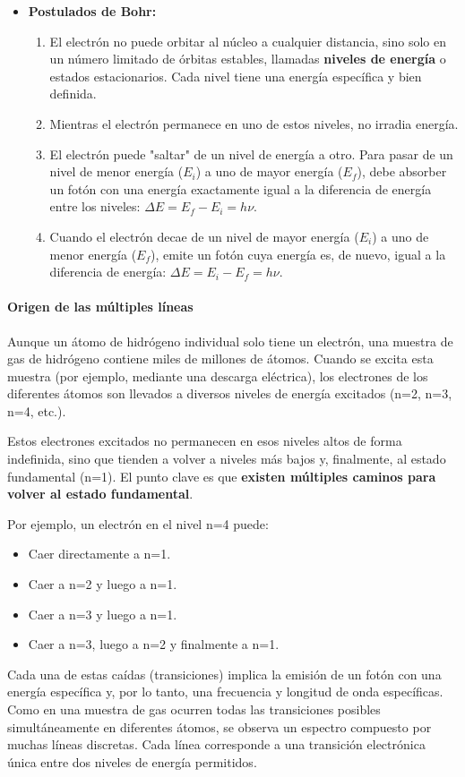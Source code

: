 \begin{itemize}
    \item \textbf{Postulados de Bohr:}
    \begin{enumerate}
        \item El electrón no puede orbitar al núcleo a cualquier distancia, sino solo en un número limitado de órbitas estables, llamadas \textbf{niveles de energía} o estados estacionarios. Cada nivel tiene una energía específica y bien definida.
        \item Mientras el electrón permanece en uno de estos niveles, no irradia energía.
        \item El electrón puede "saltar" de un nivel de energía a otro. Para pasar de un nivel de menor energía ($E_i$) a uno de mayor energía ($E_f$), debe absorber un fotón con una energía exactamente igual a la diferencia de energía entre los niveles: $\Delta E = E_f - E_i = h\nu$.
        \item Cuando el electrón decae de un nivel de mayor energía ($E_i$) a uno de menor energía ($E_f$), emite un fotón cuya energía es, de nuevo, igual a la diferencia de energía: $\Delta E = E_i - E_f = h\nu$.
    \end{enumerate}
\end{itemize}

\paragraph{Origen de las múltiples líneas}
Aunque un átomo de hidrógeno individual solo tiene un electrón, una muestra de gas de hidrógeno contiene miles de millones de átomos. Cuando se excita esta muestra (por ejemplo, mediante una descarga eléctrica), los electrones de los diferentes átomos son llevados a diversos niveles de energía excitados (n=2, n=3, n=4, etc.).

Estos electrones excitados no permanecen en esos niveles altos de forma indefinida, sino que tienden a volver a niveles más bajos y, finalmente, al estado fundamental (n=1). El punto clave es que \textbf{existen múltiples caminos para volver al estado fundamental}.

Por ejemplo, un electrón en el nivel n=4 puede:
\begin{itemize}
    \item Caer directamente a n=1.
    \item Caer a n=2 y luego a n=1.
    \item Caer a n=3 y luego a n=1.
    \item Caer a n=3, luego a n=2 y finalmente a n=1.
\end{itemize}
Cada una de estas caídas (transiciones) implica la emisión de un fotón con una energía específica y, por lo tanto, una frecuencia y longitud de onda específicas. Como en una muestra de gas ocurren todas las transiciones posibles simultáneamente en diferentes átomos, se observa un espectro compuesto por muchas líneas discretas. Cada línea corresponde a una transición electrónica única entre dos niveles de energía permitidos.

